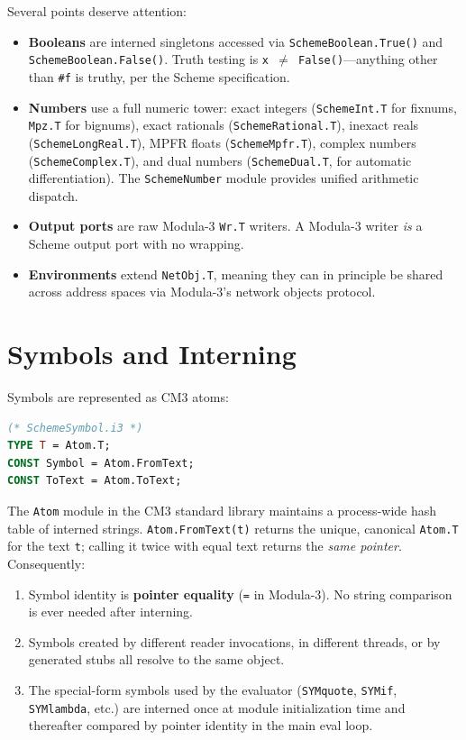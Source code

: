 \documentclass[12pt]{report}
\begin{document}
Several points deserve attention:

\begin{itemize}
\item \textbf{Booleans} are interned singletons accessed via
  \texttt{SchemeBoolean.True()} and \texttt{SchemeBoolean.False()}.
  Truth testing is \texttt{x $\neq$ False()}---anything other than
  \texttt{\#f} is truthy, per the Scheme specification.

\item \textbf{Numbers} use a full numeric tower: exact integers
  (\texttt{SchemeInt.T} for fixnums, \texttt{Mpz.T} for bignums),
  exact rationals (\texttt{SchemeRational.T}), inexact reals
  (\texttt{SchemeLongReal.T}), MPFR floats (\texttt{SchemeMpfr.T}),
  complex numbers (\texttt{SchemeComplex.T}), and dual numbers
  (\texttt{SchemeDual.T}, for automatic differentiation).  The
  \texttt{SchemeNumber} module provides unified arithmetic dispatch.

\item \textbf{Output ports} are raw Modula-3 \texttt{Wr.T} writers.
  A Modula-3 writer \emph{is} a Scheme output port with no wrapping.

\item \textbf{Environments} extend \texttt{NetObj.T}, meaning they can in
  principle be shared across address spaces via Modula-3's network objects
  protocol.
\end{itemize}

\section{Symbols and Interning}
\label{sec:symbols}

Symbols are represented as CM3 atoms:

\begin{lstlisting}[language=Modula3]
(* SchemeSymbol.i3 *)
TYPE T = Atom.T;
CONST Symbol = Atom.FromText;
CONST ToText = Atom.ToText;
\end{lstlisting}

The \texttt{Atom} module in the CM3 standard library maintains a
process-wide hash table of interned strings.  \texttt{Atom.FromText(t)}
returns the unique, canonical \texttt{Atom.T} for the text \texttt{t};
calling it twice with equal text returns the \emph{same pointer}.
Consequently:

\begin{enumerate}
\item Symbol identity is \textbf{pointer equality} (\texttt{=} in
  Modula-3).  No string comparison is ever needed after interning.
\item Symbols created by different reader invocations, in different
  threads, or by generated stubs all resolve to the same object.
\item The special-form symbols used by the evaluator (\texttt{SYMquote},
  \texttt{SYMif}, \texttt{SYMlambda}, etc.) are interned once at module
  initialization time and thereafter compared by pointer identity in the
  main eval loop.
\end{enumerate}
\end{document}
